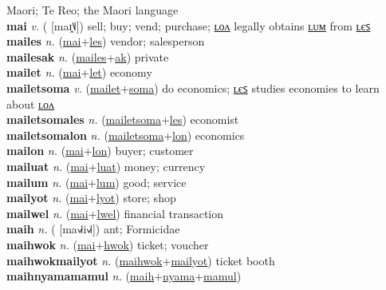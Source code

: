 Maori; Te Reo; the Maori language \label{'maolitilip} \\
\textbf{mai} \textit{v.} ( [maɪ̯˥˩])
sell; buy; vend; purchase; \hyperref[mailon]{ʟᴏᴧ} legally obtains \hyperref[mailum]{ʟᴜᴍ} from \hyperref[mailes]{ʟєꜱ} \label{mai} \\
\textbf{mailes} \textit{n.} (\hyperref[mai]{mai}+\hyperref[les]{les})
vendor; salesperson \label{mailes} \\
\textbf{mailesak} \textit{n.} (\hyperref[mailes]{mailes}+\hyperref[ak]{ak})
private \label{mailesak} \\
\textbf{mailet} \textit{n.} (\hyperref[mai]{mai}+\hyperref[let]{let})
economy \label{mailet} \\
\textbf{mailetsoma} \textit{v.} (\hyperref[mailet]{mailet}+\hyperref[soma]{soma})
do economics; \hyperref[mailetsomales]{ʟєꜱ} studies economies to learn about \hyperref[mailetsomalon]{ʟᴏᴧ} \label{mailetsoma} \\
\textbf{mailetsomales} \textit{n.} (\hyperref[mailetsoma]{mailetsoma}+\hyperref[les]{les})
economist \label{mailetsomales} \\
\textbf{mailetsomalon} \textit{n.} (\hyperref[mailetsoma]{mailetsoma}+\hyperref[lon]{lon})
economics \label{mailetsomalon} \\
\textbf{mailon} \textit{n.} (\hyperref[mai]{mai}+\hyperref[lon]{lon})
buyer; customer \label{mailon} \\
\textbf{mailuat} \textit{n.} (\hyperref[mai]{mai}+\hyperref[luat]{luat})
money; currency \label{mailuat} \\
\textbf{mailum} \textit{n.} (\hyperref[mai]{mai}+\hyperref[lum]{lum})
good; service \label{mailum} \\
\textbf{mailyot} \textit{n.} (\hyperref[mai]{mai}+\hyperref[lyot]{lyot})
store; shop \label{mailyot} \\
\textbf{mailwel} \textit{n.} (\hyperref[mai]{mai}+\hyperref[lwel]{lwel})
financial transaction \label{mailwel} \\
\textbf{maih} \textit{n.} ( [ma˧˩˧i˧˩˧])
ant; Formicidae \label{maih} \\
\textbf{maihwok} \textit{n.} (\hyperref[mai]{mai}+\hyperref[hwok]{hwok})
ticket; voucher \label{maihwok} \\
\textbf{maihwokmailyot} \textit{n.} (\hyperref[maihwok]{maihwok}+\hyperref[mailyot]{mailyot})
ticket booth \label{maihwokmailyot} \\
\textbf{maihnyamamamul} \textit{n.} (\hyperref[maih]{maih}+\hyperref[nyama]{nyama}+\hyperref[mamul]{mamul})

